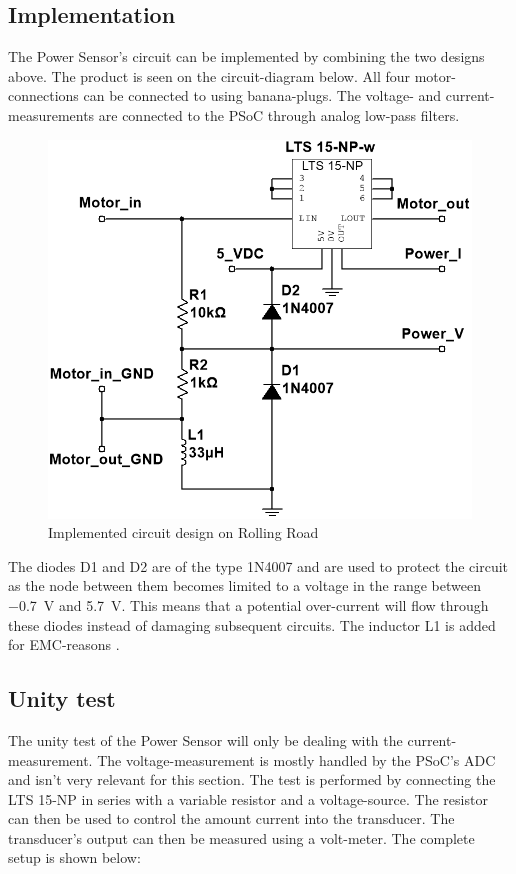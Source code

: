 \subsection{Implementation}
The Power Sensor's circuit can be implemented by combining the two designs above. The product is seen on the circuit-diagram below. All four motor-connections can be connected to using banana-plugs. The voltage- and current-measurements are connected to the PSoC through analog low-pass filters.

\begin{figure}[H]
	\centering
	\includegraphics[width=0.7\linewidth]{Hardware/Pictures/PowerSensor_circuit}
	\caption{Implemented circuit design on Rolling Road}
	\label{fig:PowerSensor_circuit}
\end{figure}

The diodes D1 and D2 are of the type 1N4007 and are used to protect the circuit as the node between them becomes limited to a voltage in the range between \SI{-0.7}{\volt} and \SI{5.7}{\volt}. This means that a potential over-current will flow through these diodes instead of damaging subsequent circuits. The inductor L1 is added for EMC-reasons .

\subsection{Unity test}
\label{sec:PowerSensorTest}
The unity test of the Power Sensor will only be dealing with the current-measurement. The voltage-measurement is mostly handled by the PSoC's ADC and isn't very relevant for this section. The test is performed by connecting the LTS 15-NP in series with a variable resistor and a voltage-source. The resistor can then be used to control the amount current into the transducer. The transducer's output can then be measured using a volt-meter. The complete setup is shown below:


